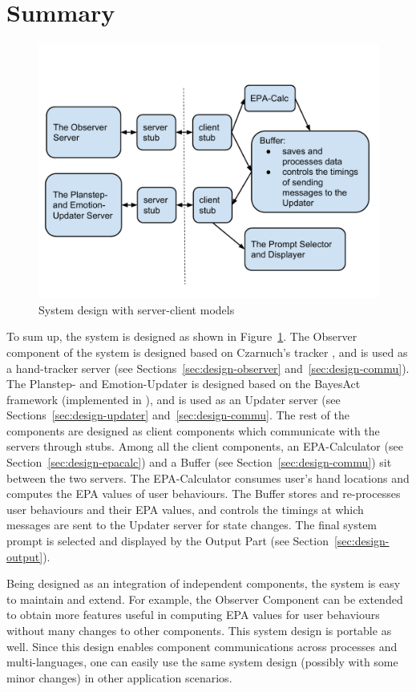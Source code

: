 \section{Summary}

\begin{figure}[h]
\centering
\includegraphics[trim = 0mm 15mm 0mm 20mm, clip, width=0.8\linewidth]{fig/fig-system.pdf}
\caption{System design with server-client models}
\label{fig:system}
\end{figure}

To sum up, the system is designed as shown in Figure~\ref{fig:system}. The Observer component of the system is designed based on Czarnuch's tracker \cite{czarnuch2014}, and is used as a hand-tracker server (see Sections~\ref{sec:design-observer} and~\ref{sec:design-commu}). The Planstep- and Emotion-Updater is designed based on the BayesAct framework (implemented in \cite{hoey2013bayesian}), and is used as an Updater server (see Sections~\ref{sec:design-updater} and~\ref{sec:design-commu}. The rest of the components are designed as client components which communicate with the servers through stubs. Among all the client components, an EPA-Calculator (see Section~\ref{sec:design-epacalc}) and a Buffer (see Section~\ref{sec:design-commu}) sit between the two servers. The EPA-Calculator consumes user's hand locations and computes the EPA values of user behaviours. The Buffer stores and re-processes user behaviours and their EPA values, and controls the timings at which messages are sent to the Updater server for state changes. The final system prompt is selected and displayed by the Output Part (see Section~\ref{sec:design-output}).

Being designed as an integration of independent components, the system is easy to maintain and extend. For example, the Observer Component can be extended to obtain more features useful in computing EPA values for user behaviours without many changes to other components. This system design is portable as well. Since this design enables component communications across processes and multi-languages, one can easily use the same system design (possibly with some minor changes) in other application scenarios.



